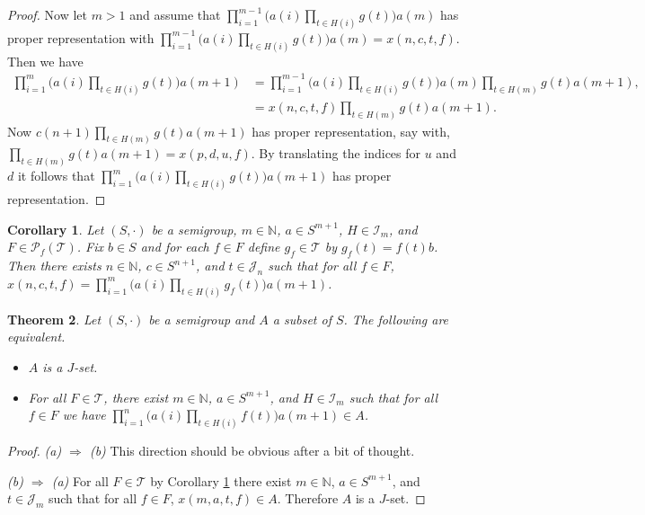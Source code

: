 \documentclass[12pt]{article}
\theoremstyle{plain}
\newtheorem{thm}{Theorem}[section]
\newtheorem{cor}[thm]{Corollary}
\theoremstyle{definition}
\newcommand{\bbN}{\mathbb{N}}
\newcommand{\calI}{\mathcal{I}}
\newcommand{\calJ}{\mathcal{J}}
\newcommand{\calT}{\mathcal{T}}
\newcommand{\Pf}{\mathcal{P}_f}
\begin{document}
\begin{proof}
  Now let $m > 1$ and assume that $\prod_{i=1}^{m-1} \bigl( a(i) \prod_{t \in H(i)} g(t) \bigr) a(m)$ has proper representation with $\prod_{i=1}^{m-1} \bigl( a(i) \prod_{t \in H(i)} g(t) \bigr) a(m) = x(n, c, t, f)$. 
  Then we have 
  \begin{align*}
    \textstyle
    \prod_{i=1}^{m} \bigl( a(i) \prod_{t \in H(i)} g(t) \bigr) a(m+1) &= \textstyle
    \prod_{i=1}^{m-1} \bigl( a(i) \prod_{t \in H(i)} g(t) \bigr) a(m) \prod_{t \in H(m)} g(t) a(m+1), \\
    &= \textstyle 
    x(n, c, t, f) \prod_{t \in H(m)} g(t) a(m+1).
  \end{align*}
  Now $c(n+1) \prod_{t \in H(m)} g(t) a(m+1)$ has proper representation, say with, $\prod_{t \in H(m)} g(t) a(m+1) = x(p, d, u, f)$.
  By translating the indices for $u$ and $d$ it follows that $\prod_{i=1}^{m} \bigl( a(i) \prod_{t \in H(i)} g(t) \bigr) a(m+1)$ has proper representation.
\end{proof}

\begin{cor}
  \label{cor:strong-jsets}
  Let $(S, \cdot)$ be a semigroup, $m \in \bbN$, $a \in S^{m+1}$, $H \in \calI_m$, and $F \in \Pf(\calT)$. 
  Fix $b \in S$ and for each $f \in F$ define $g_f \in \calT$ by $g_f(t) = f(t)b$. 
  Then there exists $n \in \bbN$, $c \in S^{n+1}$, and $t \in \calJ_n$ such that for all $f \in F$, $x(n, c, t, f) = \prod_{i=1}^m \bigl( a(i) \prod_{t \in H(i)} g_f(t)\big) a(m+1)$.
\end{cor}

\begin{thm}
  Let $(S, \cdot)$ be a semigroup and $A$ a subset of $S$.
  The following are equivalent. 
  \begin{itemize}
    \item[(a)] $A$ is a $J$-set.
    \item[(b)] For all $F \in \calT$, there exist $m \in \bbN$, $a \in S^{m+1}$, and $H \in \calI_m$ such that for all $f \in F$ we have $\prod_{i=1}^n\bigl( a(i) \prod_{t \in H(i)} f(t) \bigr) a(m+1) \in A$.
  \end{itemize}
\end{thm}
\begin{proof}
  \textsl{(a) $\Rightarrow$ (b)}
  This direction should be obvious after a bit of thought. 

  \textsl{(b) $\Rightarrow$ (a)}
  For all $F \in \calT$ by Corollary \ref{cor:strong-jsets} there exist $m \in \bbN$, $a \in S^{m+1}$, and $t \in \calJ_m$ such that for all $f \in F$, $x(m, a, t, f) \in A$.
  Therefore $A$ is a $J$-set.
\end{proof}
\end{document}
